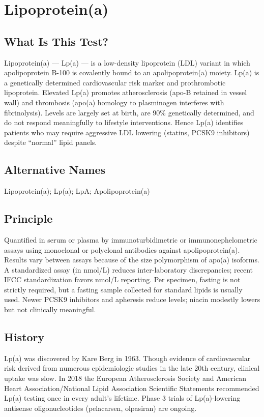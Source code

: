 \chapter{Lipoprotein(a)}

\section*{What Is This Test?}
Lipoprotein(a) --- Lp(a) --- is a low-density lipoprotein (LDL) variant in which apolipoprotein B-100 is covalently bound to an apolipoprotein(a) moiety. Lp(a) is a genetically determined cardiovascular risk marker and prothrombotic lipoprotein. Elevated Lp(a) promotes atherosclerosis (apo-B retained in vessel wall) and thrombosis (apo(a) homology to plasminogen interferes with fibrinolysis). Levels are largely set at birth, are 90\% genetically determined, and do not respond meaningfully to lifestyle interventions. Hence Lp(a) identifies patients who may require aggressive LDL lowering (statins, PCSK9 inhibitors) despite ``normal'' lipid panels.

\section*{Alternative Names}
Lipoprotein(a); Lp(a); LpA; Apolipoprotein(a)

\section*{Principle}
Quantified in serum or plasma by immunoturbidimetric or immunonephelometric assays using monoclonal or polyclonal antibodies against apolipoprotein(a). Results vary between assays because of the size polymorphism of apo(a) isoforms. A standardized assay (in nmol/L) reduces inter-laboratory discrepancies; recent IFCC standardization favors nmol/L reporting. Per specimen, fasting is not strictly required, but a fasting sample collected for standard lipids is usually used. Newer PCSK9 inhibitors and apheresis reduce levels; niacin modestly lowers but not clinically meaningful.

\section*{History}
Lp(a) was discovered by Kare Berg in 1963. Though evidence of cardiovascular risk derived from numerous epidemiologic studies in the late 20th century, clinical uptake was slow. In 2018 the European Atherosclerosis Society and American Heart Association/National Lipid Association Scientific Statements recommended Lp(a) testing once in every adult's lifetime. Phase 3 trials of Lp(a)-lowering antisense oligonucleotides (pelacarsen, olpasiran) are ongoing.

